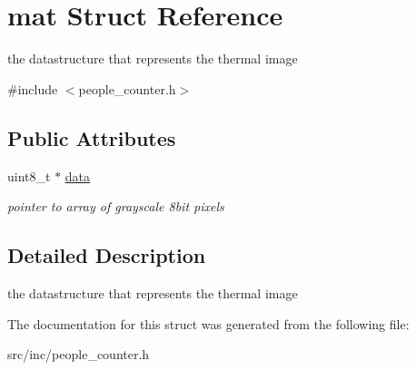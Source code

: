 \hypertarget{structmat}{}\section{mat Struct Reference}
\label{structmat}


the datastructure that represents the thermal image  




{\ttfamily \#include $<$people\+\_\+counter.\+h$>$}

\subsection*{Public Attributes}
\begin{DoxyCompactItemize}
\item 
\mbox{\label{structmat_a2507da59ef29d2b20d4ed263229ec6d6}} 
uint8\+\_\+t $\ast$ \mbox{\hyperlink{structmat_a2507da59ef29d2b20d4ed263229ec6d6}{data}}
\begin{DoxyCompactList}\small\item\em pointer to array of grayscale 8bit pixels \end{DoxyCompactList}\end{DoxyCompactItemize}


\subsection{Detailed Description}
the datastructure that represents the thermal image 



The documentation for this struct was generated from the following file\+:\begin{DoxyCompactItemize}
\item 
src/inc/people\+\_\+counter.\+h\end{DoxyCompactItemize}
